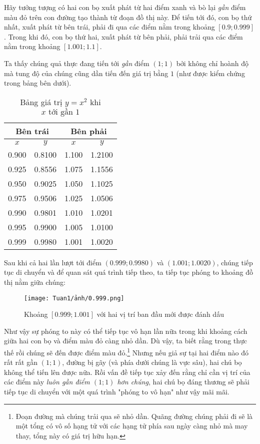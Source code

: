 Hãy tưởng tượng có hai con bọ xuất phát từ hai điểm xanh và bò lại \emph{gần} điểm màu đỏ trên con đường tạo thành từ đoạn đồ thị này. Để tiến tới đó, con bọ thứ nhất, xuất phát từ bên trái, phải đi qua các điểm nằm trong khoảng $[0.9;0.999]$. Trong khi đó, con bọ thứ hai, xuất phát từ bên phải, phải trải qua các điểm nằm trong khoảng $[1.001;1.1]$.

Ta thấy chúng quả thực đang tiến tới \emph{gần} điểm $(1;1)$ bởi không chỉ hoành độ mà tung độ của chúng cũng dần tiến đến giá trị bằng $1$ (như được kiểm chứng trong bảng bên dưới).
\begin{table}[H]
    \centering
    \caption{Bảng giá trị \( y = x^2 \) khi \( x \text{~tới gần } 1 \)}
    \begin{tabular}{|c|c||c|c|}
    \hline
    \multicolumn{2}{|c||}{Bên trái} & \multicolumn{2}{c|}{Bên phải} \\
    \hline
    \( x \) & \( y \) & \( x \) & \( y \) \\
    \hline
    0.900 & 0.8100 & 1.100 & 1.2100 \\
    0.925 & 0.8556 & 1.075 & 1.1556 \\
    0.950 & 0.9025 & 1.050 & 1.1025 \\
    0.975 & 0.9506 & 1.025 & 1.0506 \\
    0.990 & 0.9801 & 1.010 & 1.0201 \\
    0.995 & 0.9900 & 1.005 & 1.0100 \\
    0.999 & 0.9980 & 1.001 & 1.0020 \\
    \hline
    \end{tabular}
\end{table}
   
Sau khi cả hai lần lượt tới điểm $(0.999;0.9980)$ và $(1.001;1.0020)$, chúng tiếp tục di chuyển và để quan sát quá trình tiếp theo, ta tiếp tục phóng to khoảng đồ thị nằm giữa chúng:
\begin{figure}[h!]
    \centering
    \texttt{[image: Tuan1/ảnh/0.999.png]}
    \caption{Khoảng \([0.999;1.001]\) với hai vị trí ban đầu mới được đánh dấu }
\end{figure}

Như vậy sự phóng to này có thể tiếp tục vô hạn lần nữa trong khi khoảng cách giữa hai con bọ và điểm màu đỏ càng nhỏ dần. Dù vậy, ta biết rằng trong thực thế rồi chúng sẽ đến được điểm màu đỏ.\footnote{Đoạn đường mà chúng trải qua sẽ nhỏ dần. Quãng đường chúng phải đi sẽ là một tổng có vô số hạng tử với các hạng tử phía sau ngày càng nhỏ mà may thay, tổng này có giá trị hữu hạn. }\newline
Nhưng nếu giả sự tại hai điểm nào đó rất rất gần $(1;1)$, đường bị gãy (và phía dưới chúng là vực sâu), hai chú bọ không thể tiến lên được nữa. Rồi vấn đề tiếp tục xảy đến rằng chỉ cần vị trí của các điểm này \emph{luôn gần điểm $(1;1)$ hơn chúng}, hai chú bọ đáng thương sẽ phải tiếp tục di chuyển với một quá trình "phóng to vô hạn" như vậy mãi mãi.

